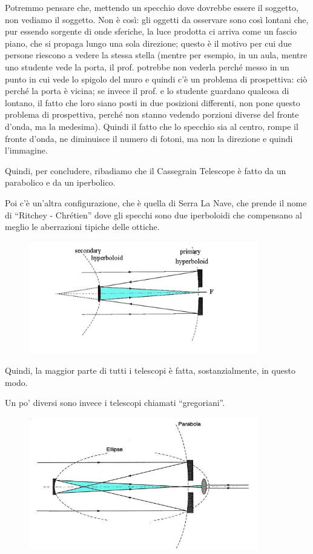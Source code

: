 Potremmo pensare che, mettendo un specchio dove dovrebbe essere il soggetto, non vediamo il soggetto. Non è così: gli oggetti da osservare sono così lontani che, pur essendo sorgente di onde sferiche, la luce prodotta ci arriva come un fascio piano, che si propaga lungo una sola direzione; questo è il motivo per cui due persone riescono a vedere la stessa stella (mentre per esempio, in un aula, mentre uno studente vede la porta, il prof. potrebbe non vederla perché messo in un punto in cui vede lo spigolo del muro e quindi c'è un problema di prospettiva: ciò perché la porta è vicina; se invece il prof. e lo studente guardano qualcosa di lontano, il fatto che loro siano posti in due posizioni differenti, non pone questo problema di prospettiva, perché non stanno vedendo porzioni diverse del fronte d'onda, ma la medesima). Quindi il fatto che lo specchio sia al centro, rompe il fronte d'onda, ne diminuisce il numero di fotoni, ma non la direzione e quindi l'immagine.

Quindi, per concludere, ribadiamo che il Cassegrain Telescope è fatto da un parabolico e da un iperbolico. 

Poi c'è un'altra configurazione, che è quella di Serra La Nave, che prende il nome di “Ritchey - Chrétien” dove gli specchi sono due iperboloidi che compensano al meglio le aberrazioni tipiche delle ottiche.

\begin{figure}[H]
        \centering
        \includegraphics[width=10cm]{4.png}
    \end{figure}

Quindi, la maggior parte di tutti i telescopi è fatta, sostanzialmente, in questo modo.

Un po' diversi sono invece i telescopi chiamati “gregoriani”. 

\begin{figure}[H]
        \centering
        \includegraphics[width=10cm]{5.jpg}
        \label{}
    \end{figure}


